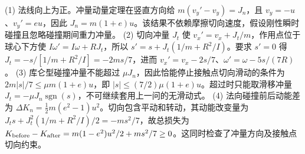 (1) 法线向上为正。冲量动量定理在竖直方向给 \(m(v_y'-v_y)=J_n\)，且 \(v_y=-u\)、\(v_y'=eu\)，因此 \(J_n=m(1+e)u\)。该结果不依赖摩擦切向速度，假设刚性瞬时碰撞且忽略碰撞期间重力冲量。
(2) 切向冲量 \(J_t\) 使 \(v_x'=v_x+J_t/m\)，作用点位于球心下方使 \(I\omega'=I\omega+RJ_t\)，所以 \(s'=s+J_t(1/m+R^2/I)\)。要求 \(s'=0\) 得 \(J_t=-s/[1/m+R^2/I]=-2ms/7\)，进而 \(v_x'=v_x-2s/7\)、\(\omega'=\omega-5s/(7R)\)。
(3) 库仑型碰撞冲量不能超过 \(\mu J_n\)，因此恰能停止接触点切向滑动的条件为 \(2m|s|/7\le\mu m(1+e)u\)，即 \(|s|\le(7/2)\mu(1+e)u\)。超过时只能取滑移冲量 \(J_t=-\mu J_n\operatorname{sgn}(s)\)，不可继续套用上一问的无滑动式。
(4) 法向碰撞前后动能差为 \(\Delta K_n=\tfrac12m(e^2-1)u^2\)。切向包含平动和转动，其动能改变量为 \(J_ts+J_t^2(1/m+R^2/I)/2=-ms^2/7\)，故总损失为 \(K_{\rm before}-K_{\rm after}=m(1-e^2)u^2/2+ms^2/7\ge0\)。这同时检查了冲量方向及接触点切向约束。
